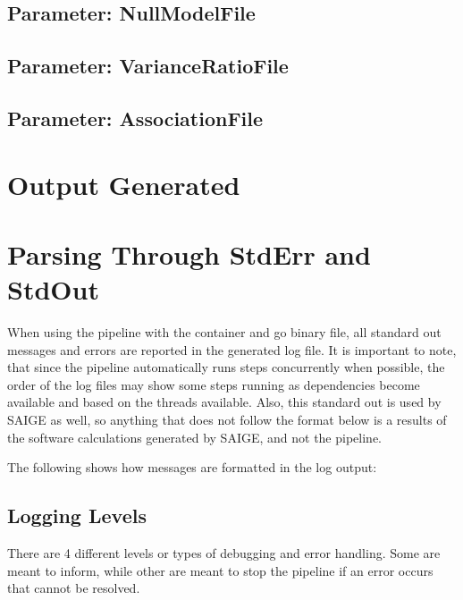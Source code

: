 \documentclass[letterpaper,10pt,english]{sphinxmanual}
\let\sphinxpxdimen\pdfpxdimen\else\newdimen\sphinxpxdimen
\begin{document}
\subsection{Parameter: NullModelFile}
\label{\detokenize{fileFormats:parameter-nullmodelfile}}

\subsection{Parameter: VarianceRatioFile}
\label{\detokenize{fileFormats:parameter-varianceratiofile}}

\subsection{Parameter: AssociationFile}
\label{\detokenize{fileFormats:parameter-associationfile}}

\section{Output Generated}
\label{\detokenize{output:output-generated}}\label{\detokenize{output::doc}}

\section{Parsing Through StdErr and StdOut}
\label{\detokenize{parsingStdErrOut:parsing-through-stderr-and-stdout}}\label{\detokenize{parsingStdErrOut::doc}}
When using the pipeline with the container and go binary file, all standard out messages and errors are reported in the generated log file.  It is important to note, that since the pipeline automatically runs steps concurrently when possible, the order of the log files may show some steps running as dependencies become available and based on the threads available.  Also, this standard out is used by SAIGE as well, so anything that does not follow the format below is a results of the software calculations generated by SAIGE, and not the pipeline.

The following shows how messages are formatted in the log output:

\noindent\sphinxincludegraphics[width=800\sphinxpxdimen]{{messageFormat}.png}


\subsection{Logging Levels}
\label{\detokenize{parsingStdErrOut:logging-levels}}
There are 4 different levels or types of debugging and error handling.  Some are meant to inform, while other are meant to stop the pipeline if an error occurs that cannot be resolved.
\end{document}
